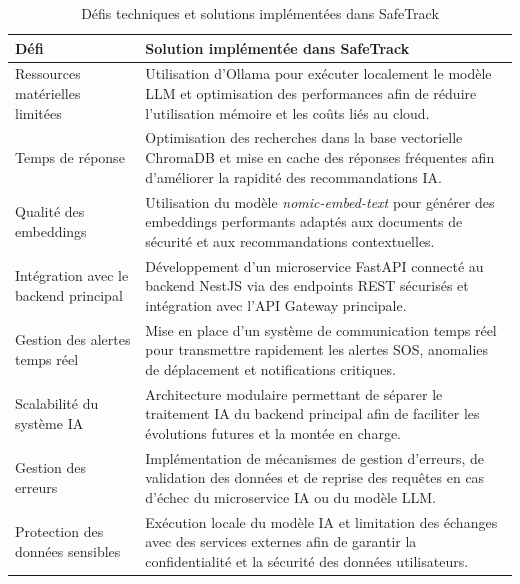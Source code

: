 \begin{table}[h!]
\centering
\renewcommand{\arraystretch}{1.5}
\begin{tabular}{|p{5cm}|p{9cm}|}
\hline
\textbf{Défi} & \textbf{Solution implémentée dans SafeTrack} \\
\hline

Ressources matérielles limitées 
& Utilisation d’Ollama pour exécuter localement le modèle LLM et optimisation des performances afin de réduire l’utilisation mémoire et les coûts liés au cloud. \\
\hline

Temps de réponse 
& Optimisation des recherches dans la base vectorielle ChromaDB et mise en cache des réponses fréquentes afin d’améliorer la rapidité des recommandations IA. \\
\hline

Qualité des embeddings 
& Utilisation du modèle \textit{nomic-embed-text} pour générer des embeddings performants adaptés aux documents de sécurité et aux recommandations contextuelles. \\
\hline

Intégration avec le backend principal 
& Développement d’un microservice FastAPI connecté au backend NestJS via des endpoints REST sécurisés et intégration avec l’API Gateway principale. \\
\hline

Gestion des alertes temps réel 
& Mise en place d’un système de communication temps réel pour transmettre rapidement les alertes SOS, anomalies de déplacement et notifications critiques. \\
\hline

Scalabilité du système IA 
& Architecture modulaire permettant de séparer le traitement IA du backend principal afin de faciliter les évolutions futures et la montée en charge. \\
\hline

Gestion des erreurs 
& Implémentation de mécanismes de gestion d’erreurs, de validation des données et de reprise des requêtes en cas d’échec du microservice IA ou du modèle LLM. \\
\hline

Protection des données sensibles 
& Exécution locale du modèle IA et limitation des échanges avec des services externes afin de garantir la confidentialité et la sécurité des données utilisateurs. \\
\hline

\end{tabular}
\caption{Défis techniques et solutions implémentées dans SafeTrack}
\end{table}

